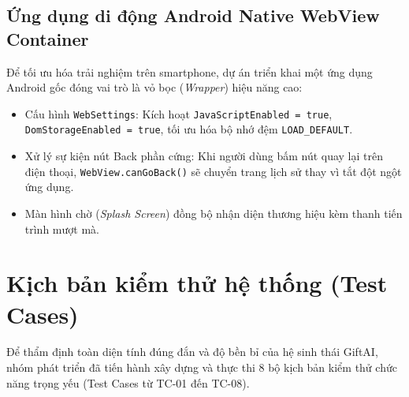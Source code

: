 \subsection{Ứng dụng di động Android Native WebView Container}
Để tối ưu hóa trải nghiệm trên smartphone, dự án triển khai một ứng dụng Android gốc đóng vai trò là vỏ bọc (\textit{Wrapper}) hiệu năng cao:
\begin{itemize}
    \item Cấu hình \texttt{WebSettings}: Kích hoạt \texttt{JavaScriptEnabled = true}, \texttt{DomStorageEnabled = true}, tối ưu hóa bộ nhớ đệm \texttt{LOAD\_DEFAULT}.
    \item Xử lý sự kiện nút Back phần cứng: Khi người dùng bấm nút quay lại trên điện thoại, \texttt{WebView.canGoBack()} sẽ chuyển trang lịch sử thay vì tắt đột ngột ứng dụng.
    \item Màn hình chờ (\textit{Splash Screen}) đồng bộ nhận diện thương hiệu kèm thanh tiến trình mượt mà.
\end{itemize}

\section{Kịch bản kiểm thử hệ thống (Test Cases)}

Để thẩm định toàn diện tính đúng đắn và độ bền bỉ của hệ sinh thái GiftAI, nhóm phát triển đã tiến hành xây dựng và thực thi 8 bộ kịch bản kiểm thử chức năng trọng yếu (Test Cases từ TC-01 đến TC-08).

